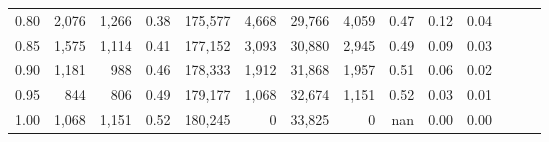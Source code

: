 \begin{tabular}{rrrrrrrrrrrrrr}
0.80 &   2,076 &  1,266 &  0.38 &  175,577 &    4,668 &  29,766 &   4,059 &  0.47 &  0.12 &      0.04 \\
0.85 &   1,575 &  1,114 &  0.41 &  177,152 &    3,093 &  30,880 &   2,945 &  0.49 &  0.09 &      0.03 \\
0.90 &   1,181 &    988 &  0.46 &  178,333 &    1,912 &  31,868 &   1,957 &  0.51 &  0.06 &      0.02 \\
0.95 &     844 &    806 &  0.49 &  179,177 &    1,068 &  32,674 &   1,151 &  0.52 &  0.03 &      0.01 \\
1.00 &   1,068 &  1,151 &  0.52 &  180,245 &        0 &  33,825 &       0 &   nan &  0.00 &      0.00 \\
\bottomrule
\end{tabular}
